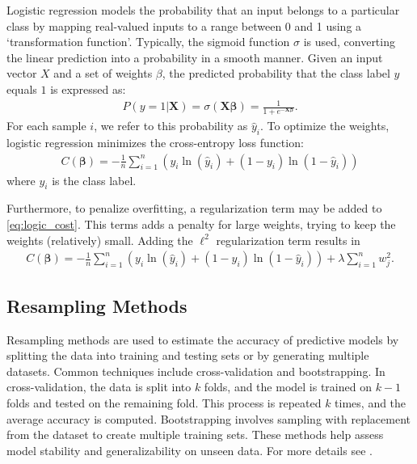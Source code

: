 \documentclass[%
reprint,s
amsmath,amssymb,
aps,
]{revtex4-2}
\begin{document}
Logistic regression models the probability that an input belongs to a particular class by mapping real-valued inputs to a range between 0 and 1 using a `transformation function'. Typically, the sigmoid function \(\sigma\) is used, converting the linear prediction into a probability in a smooth manner. Given an input vector \(X\) and a set of weights \(\beta\), the predicted probability that the class label \(y\) equals \(1\) is expressed as:
\begin{align}
	P(y=1|\bm X)=\sigma(\bm X\bm\beta)=\frac{1}{1+e^{-\bm X\bm\beta}}.
\end{align}
For each sample \(i\), we refer to this probability as \(\hat{y}_i\). To optimize the weights, logistic regression minimizes the cross-entropy loss function:
\begin{align}	\label{eq:logic_cost}
	C(\bm\beta)=-\frac1n\sum_{i=1}^n\left(y_i \ln(\hat y_i)+(1-y_i)\ln(1-\hat y_i) \right)
\end{align}
where $y_i$ is the class label. 

Furthermore, to penalize overfitting, a regularization term may be added to \eqref{eq:logic_cost}. This terms adds a penalty for large weights, trying to keep the weights (relatively) small. Adding the \(\ell^2\) regularization term results in 
\begin{align}
	C(\bm\beta)=-\frac1n\sum_{i=1}^n\left(y_i \ln(\hat y_i)+(1-y_i)\ln(1-\hat y_i) \right) + \lambda\sum\limits_{i=1}^{n}w_{j}^{2}.
\end{align}

\subsection{Resampling Methods}
Resampling methods are used to estimate the accuracy of predictive models by splitting the data into training and testing sets or by generating multiple datasets. Common techniques include cross-validation and bootstrapping. In cross-validation, the data is split into $k$ folds, and the model is trained on $k-1$ folds and tested on the remaining fold. This process is repeated $k$ times, and the average accuracy is computed. Bootstrapping involves sampling with replacement from the dataset to create multiple training sets. These methods help assess model stability and generalizability on unseen data. For more details see \cite{project1}.
\end{document}
